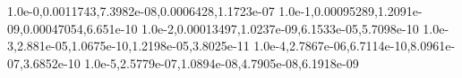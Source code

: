 1.0e-0,0.0011743,7.3982e-08,0.0006428,1.1723e-07
1.0e-1,0.00095289,1.2091e-09,0.00047054,6.651e-10
1.0e-2,0.00013497,1.0237e-09,6.1533e-05,5.7098e-10
1.0e-3,2.881e-05,1.0675e-10,1.2198e-05,3.8025e-11
1.0e-4,2.7867e-06,6.7114e-10,8.0961e-07,3.6852e-10
1.0e-5,2.5779e-07,1.0894e-08,4.7905e-08,6.1918e-09
